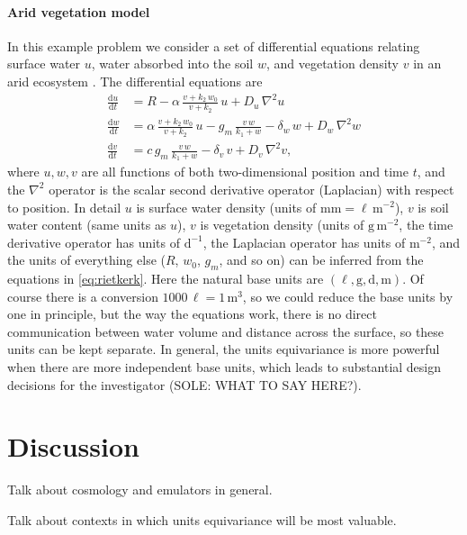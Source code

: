 \documentclass[nohyperref]{article}
\theoremstyle{plain}
\theoremstyle{definition}
\theoremstyle{remark}
\newcommand{\dd}{\mathrm{d}}
\newcommand{\unit}[1]{\mathrm{#1}}
\newcommand{\g}{\unit{g}}
\newcommand{\m}{\unit{m}}
\newcommand{\mm}{\unit{mm}}
\renewcommand{\l}{\unit{\ell}}
\renewcommand{\d}{\unit{d}}
\begin{document}
\paragraph{Arid vegetation model}
In this example problem we consider a set of differential equations relating surface water $u$, water absorbed into the soil $w$, and vegetation density $v$ in an arid ecosystem \cite{rietkerk}.
The differential equations are
\begin{align}\label{eq:rietkerk}
    \frac{\dd u}{\dd t} &= R - \alpha\,\frac{v + k_2\,w_0}{v + k_2}\,u + D_u\,\nabla^2 u\nonumber\\
    \frac{\dd w}{\dd t} &= \alpha\,\frac{v + k_2\,w_0}{v + k_2}\,u - g_m\,\frac{v\,w}{k_1 + w} - \delta_w\,w + D_w\,\nabla^2 w\nonumber\\
    \frac{\dd v}{\dd t} &= c\,g_m\,\frac{v\,w}{k_1 + w} - \delta_v\,v + D_v\,\nabla^2 v,
\end{align}
where $u,w,v$ are all functions of both two-dimensional position and time $t$, and the $\nabla^2$ operator is the scalar second derivative operator (Laplacian) with respect to position.
In detail $u$ is surface water density (units of $\mm = \l\,\m^{-2}$), $v$ is soil water content (same units as $u$), $v$ is vegetation density (units of $\g\,\m^{-2}$, the time derivative operator has units of $\d^{-1}$, the Laplacian operator has units of $\m^{-2}$, and the units of everything else ($R$, $w_0$, $g_m$, and so on) can be inferred from the equations in \eqref{eq:rietkerk}.
Here the natural base units are $(\l, \g, \d, \m)$.
Of course there is a conversion $1000\,\l=1\,\m^3$, so we could reduce the base units by one in principle, but the way the equations work, there is no direct communication between water volume and distance across the surface, so these units can be kept separate.
In general, the units equivariance is more powerful when there are more independent base units, which leads to substantial design decisions for the investigator (SOLE: WHAT TO SAY HERE?).

\section{Discussion}
Talk about cosmology and emulators in general.

Talk about contexts in which units equivariance will be most valuable.


\end{document}
